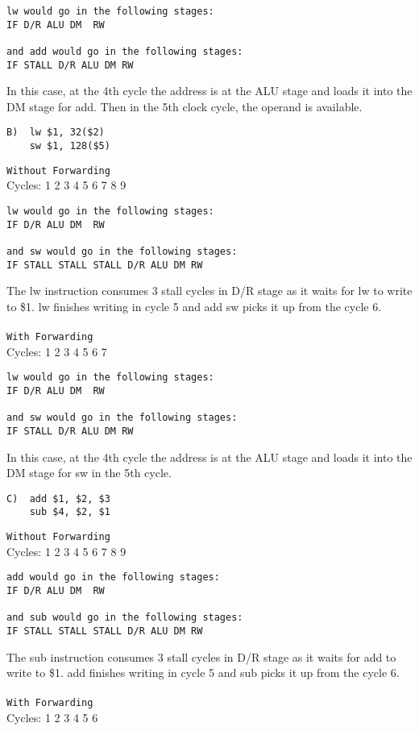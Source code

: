 \documentclass[11pt]{article}
\begin{document}
\begin{verbatim}
lw would go in the following stages:
IF D/R ALU DM  RW

and add would go in the following stages:
IF STALL D/R ALU DM RW
\end{verbatim}
In this case, at the 4th cycle the address is at the ALU stage and loads it into the DM stage for add. Then in the 5th clock cycle, the operand is available.

\begin{verbatim}
B)  lw $1, 32($2) 
    sw $1, 128($5)
\end{verbatim}
\texttt{Without Forwarding}
\\Cycles: 1   2   3   4   5   6   7   8  9

\begin{verbatim}
lw would go in the following stages:
IF D/R ALU DM  RW
    
and sw would go in the following stages:
IF STALL STALL STALL D/R ALU DM RW
\end{verbatim}
The lw instruction consumes 3 stall cycles in D/R stage as it waits for lw to write to \$1.  lw finishes writing in cycle 5 and add sw picks it up from the cycle 6.\\ \\
\texttt{With Forwarding}
\\Cycles: 1   2   3   4   5   6   7

\begin{verbatim}
lw would go in the following stages:
IF D/R ALU DM  RW

and sw would go in the following stages:
IF STALL D/R ALU DM RW
\end{verbatim}
In this case, at the 4th cycle the address is at the ALU stage and loads it into the DM stage for sw in the 5th cycle.


\begin{verbatim}
C)  add $1, $2, $3
    sub $4, $2, $1
\end{verbatim}
\texttt{Without Forwarding}
\\Cycles: 1   2   3   4   5   6   7   8  9

\begin{verbatim}
add would go in the following stages:
IF D/R ALU DM  RW
    
and sub would go in the following stages:
IF STALL STALL STALL D/R ALU DM RW
\end{verbatim}
The sub instruction consumes 3 stall cycles in D/R stage as it waits for add to write to \$1. add finishes writing in cycle 5 and sub picks it up from the cycle 6.\\ \\
\texttt{With Forwarding}
\\Cycles: 1   2   3   4   5   6
\end{document}

